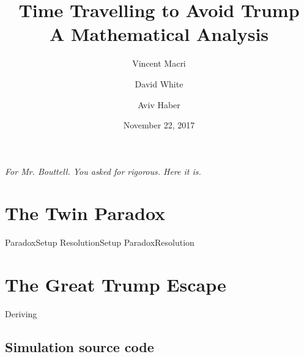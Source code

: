 \documentclass[letterpaper,12pt]{report}
\title{\Huge Time Travelling to Avoid Trump\\\LARGE A Mathematical Analysis}
\author{Vincent Macri \and David White \and Aviv Haber}
\date{November 22, 2017}
\begin{document}
	\maketitle
	\vspace*{\fill}
		\begin{center}
			\large
			\textit{For Mr. Bouttell. You asked for rigorous. Here it is.}
		\end{center}
	\vspace*{\fill}
	\clearpage
	
	\tableofcontents
	\clearpage
	\part{The Twin Paradox}\label{part:twinParadox}
		{ParadoxSetup}
		{ResolutionSetup}
		{ParadoxResolution}
	\part{The Great Trump Escape}\label{part:trumpEscape}
		{Deriving}
	\appendix
	\chapter{Simulation source code}\label{appendix:sourceCode}
		
	\nocite{*}
	\printbibliography
\end{document}
